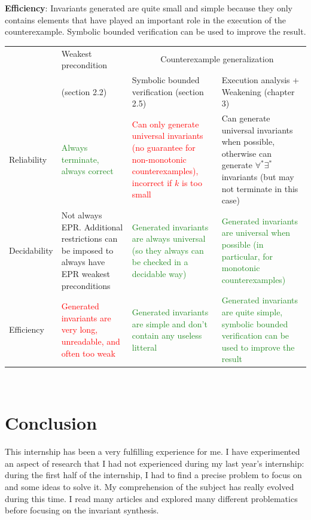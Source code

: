 \documentclass[11pt,a4paper,oldfontcommands,openany]{memoir}
\begin{document}
    \textbf{Efficiency}: Invariants generated are quite small and simple because they only contains elements that have played an important role in the execution of the counterexample.
    Symbolic bounded verification can be used to improve the result.\\

    \begin{tabularx}{\textwidth}{|l|X|X|X|}
        \hline
            & Weakest precondition & \multicolumn{2}{c|}{Counterexample generalization}\\
        \cline{3-4}
            & (section 2.2) & Symbolic bounded verification (section 2.5) & Execution analysis + Weakening (chapter 3)\\
        \hline
            Reliability & \textcolor{ForestGreen}{Always terminate, always correct} &
            \textcolor{Red}{Can only generate universal invariants (no guarantee for non-monotonic counterexamples), incorrect if \(k\) is too small}
            & \textcolor{Dandelion}{Can generate universal invariants when possible, otherwise can generate \(\forall^*\exists^*\) invariants (but may not terminate in this case)}\\
        \hline
            Decidability & \textcolor{Dandelion}{Not always EPR. Additional restrictions can be imposed to always have EPR weakest preconditions}
            & \textcolor{ForestGreen}{Generated invariants are always universal (so they always can be checked in a decidable way)}
            & \textcolor{ForestGreen}{Generated invariants are universal when possible (in particular, for monotonic counterexamples)}\\
        \hline
            Efficiency & \textcolor{Red}{Generated invariants are very long, unreadable, and often too weak}
            & \textcolor{ForestGreen}{Generated invariants are simple and don't contain any useless litteral}
            & \textcolor{ForestGreen}{Generated invariants are quite simple, symbolic bounded verification can be used to improve the result}\\
        \hline
    \end{tabularx}\\

    \section{Conclusion}

    This internship has been a very fulfilling experience for me. I have experimented an aspect of research
    that I had not experienced during my last year's internship:
    during the first half of the internship, I had to find a precise problem to focus on and some ideas to solve it.
    My comprehension of the subject has really evolved during this time.
    I read many articles and explored many different problematics before focusing on the invariant synthesis.
    
\end{document}
